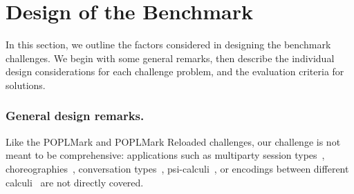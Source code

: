 \documentclass[runningheads]{llncs}
\begin{document}
\section{Design of the Benchmark}\label{sec:design-discussion}

In this section, we outline the factors considered in designing the benchmark challenges.
We begin with some general remarks, then describe the individual design considerations for each challenge problem, and the evaluation criteria for solutions.

\subsubsection{General design remarks.}
Like the POPLMark and POPLMark Reloaded challenges, our challenge is
not meant to be comprehensive: applications such as multiparty session
types~\cite{10.1145/2827695,10.1145/3290343},
choreographies~\cite{DBLP:journals/jar/CruzFilipeMP23}, conversation
types~\cite{DBLP:journals/tcs/CairesV10}, psi-calculi~\cite{lmcs:696},
or encodings between different
calculi~\cite{DBLP:journals/iandc/Gorla10,%
  DBLP:conf/ecoop/ScalasDHY17}
are not directly covered.
\end{document}
